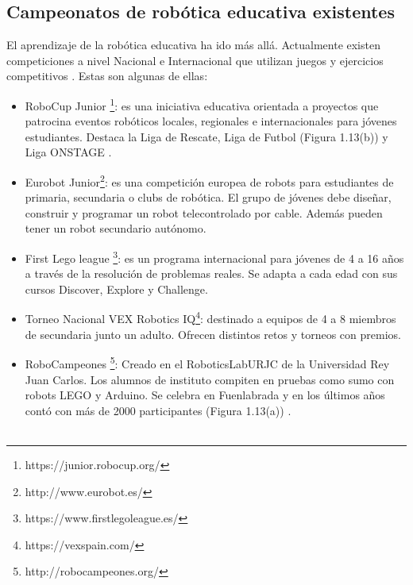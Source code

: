  
\subsection{Campeonatos de robótica educativa existentes}

El aprendizaje de la robótica educativa ha ido más allá. Actualmente existen competiciones a nivel Nacional e Internacional que utilizan juegos y ejercicios competitivos \cite{competiciones}. Estas son algunas de ellas:
\begin{itemize}
    \item RoboCup Junior \footnote{https://junior.robocup.org/}: es una iniciativa educativa orientada a proyectos que patrocina eventos robóticos locales, regionales e internacionales para jóvenes estudiantes. Destaca la Liga de Rescate, Liga de Futbol (Figura 1.13(b)) y Liga ONSTAGE \cite{robocup}.
 
    \item Eurobot Junior\footnote{http://www.eurobot.es/}: es una competición europea de robots para estudiantes de primaria, secundaria o clubs de robótica. El grupo de jóvenes debe diseñar, construir y programar un robot telecontrolado por cable. Además pueden tener un robot secundario autónomo\cite{eurobot}.
    
    \item First Lego league \footnote{https://www.firstlegoleague.es/}: es un programa internacional  para jóvenes de 4 a 16 años a través de la resolución de problemas reales. Se adapta a cada edad con sus cursos Discover, Explore y Challenge\cite{firstlego}.
    
    \item Torneo Nacional VEX Robotics IQ\footnote{https://vexspain.com/}: destinado a equipos de 4 a 8 miembros de secundaria junto un adulto. Ofrecen distintos retos y torneos con premios\cite{vex}.
    
    \item RoboCampeones \footnote{http://robocampeones.org/}: Creado en el RoboticsLabURJC de la Universidad Rey Juan Carlos. Los alumnos de instituto compiten en pruebas como sumo con robots LEGO y Arduino. Se celebra en Fuenlabrada y en los últimos años contó con más de 2000 participantes (Figura 1.13(a)) \cite{robocampeones}.
    \\
    \\
    

\end{itemize}
